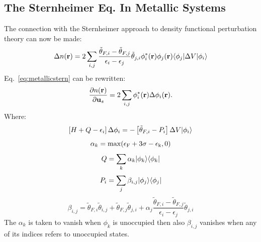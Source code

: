 \subsection{The Sternheimer Eq. In Metallic Systems}
The connection with the Sternheimer approach to density functional perturbation theory can now
be made:
%
\begin{equation}
\label{eq:metallicstern}
\Delta n({\bf r}) = 2 \sum_{i,j} \frac{\tilde{\theta}_{F,i} - \tilde{\theta}_{F,j}}{\epsilon_{i} - \epsilon_{j}}
\tilde{\theta}_{j,i}\phi^{*}_{i}({\bf r})\phi_{j}({\bf r}) \langle\phi_{j}|\Delta V|\phi_{i}\rangle
\end{equation}
%
Eq.~\ref{eq:metallicstern} can be rewritten:
%
\begin{equation}
\label{eq:nr}
\frac{\partial n({\bf r})}{\partial {\bf u}_{s}} = 2 \sum_{i,j} \phi^{*}_{i}({\bf r}) \Delta \phi_{i}({\bf r}).
\end{equation}
%
Where: 
%
\begin{equation}
\left[H + Q - \epsilon_{i}\right]\Delta \phi_{i} = -\left[\tilde{\theta}_{F,i}-P_{i}\right]\Delta V|\phi_{i}\rangle
\end{equation}
%
\begin{equation}
\alpha_{k} = \rm{max}(\epsilon_{F} + 3\sigma -\epsilon_{k},0)
\end{equation}
%
\begin{equation}
Q=\sum_{k}\alpha_{k}|\phi_{k}\rangle\langle\phi_{k}|
\end{equation}
%
\begin{equation}
P_{i} = \sum_{j} \beta_{i,j}|\phi_{j}\rangle\langle\phi_{j}|
\end{equation}
%
\begin{equation}
\beta_{i,j} = \tilde{\theta}_{F,i}\tilde{\theta}_{i,j} + 
\tilde{\theta}_{F,j}\tilde{\theta}_{j,i} + 
\alpha_{j}\frac{\tilde{\theta}_{F,i}-\tilde{\theta}_{F,j}}{\epsilon_{i}-\epsilon_{j}}\tilde{\theta}_{j,i}
\end{equation}
%
The $\alpha_{k}$ is taken to vanish when $\phi_{k}$ is unoccupied then
also $\beta_{i,j}$ vanishes when any of its indices
refers to unoccupied states.

